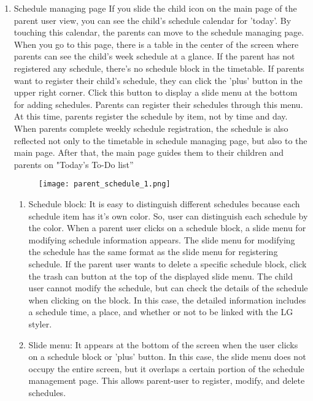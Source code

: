 \documentclass[conference]{IEEEtran}
\begin{document}
\begin{enumerate}
\begin{enumerate}
            \end{enumerate}
            \item Schedule managing page \hfill \break
            If you slide the child icon on the main page of the parent user view, you can see the child's schedule calendar for 'today'. By touching this calendar, the parents can move to the schedule managing page. When you go to this page, there is a table in the center of the screen where parents can see the child's week schedule at a glance. If the parent has not registered any schedule, there's no schedule block in the timetable. If parents want to register their child's schedule, they can click the 'plus' button in the upper right corner. Click this button to display a slide menu at the bottom for adding schedules. Parents can register their schedules through this menu. At this time, parents register the schedule by item, not by time and day. When parents complete weekly schedule registration, the schedule is also reflected not only to the timetable in schedule managing page, but also to the main page. After that, the main page guides them to their children and parents on "Today's To-Do list”
            \begin{figure}[H]
                 \centering
                 \texttt{[image: parent\_schedule\_1.png]}
                 \end{figure}
            \begin{enumerate}
                \item Schedule block: It is easy to distinguish different schedules because each schedule item has it's own color. So, user can distinguish each schedule by the color. When a parent user clicks on a schedule block, a slide menu for modifying schedule information appears. The slide menu for modifying the schedule has the same format as the slide menu for registering schedule. If the parent user wants to delete a specific schedule block, click the trash can button at the top of the displayed slide menu. The child user cannot modify the schedule, but can check the details of the schedule when clicking on the block. In this case, the detailed information includes a schedule time, a place, and whether or not to be linked with the LG styler.
                \item Slide menu: It appears at the bottom of the screen when the user clicks on a schedule block or 'plus' button. In this case, the slide menu does not occupy the entire screen, but it overlaps a certain portion of the schedule management page. This allows parent-user to register, modify, and delete schedules.

\end{enumerate}
\end{enumerate}
\end{document}
